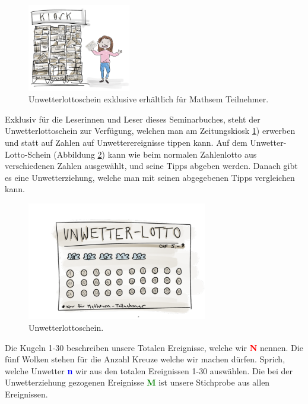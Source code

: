 \begin{refsection}
\begin{figure}[htbp]
\centering
\includegraphics[width=0.4\textwidth]{extrem/Kiosk.pdf}
\caption{Unwetterlottoschein exklusive erhältlich für Mathsem Teilnehmer.}
\label{Kiosk}
\end{figure}

Exklusiv für die Leserinnen und Leser dieses Seminarbuches, steht der Unwetterlottoschein zur Verfügung, welchen man am Zeitungskiosk \ref{Kiosk}) erwerben und statt auf Zahlen auf Unwetterereignisse tippen kann. Auf dem Unwetter-Lotto-Schein (Abbildung \ref{Lottoschein}) kann wie beim normalen Zahlenlotto aus verschiedenen Zahlen ausgewählt, und seine Tipps abgeben werden. Danach gibt es eine Unwetterziehung, welche man mit seinen abgegebenen Tipps vergleichen kann.

\begin{figure}[htbp]
\centering
\includegraphics[width=0.7\textwidth]{extrem/Lottoschein.pdf}
\caption{Unwetterlottoschein.}
\label{Lottoschein}
\end{figure}

Die Kugeln 1-30 beschreiben unsere Totalen Ereignisse, welche wir \textcolor{red}{\textbf{N}} nennen. Die fünf Wolken stehen für die Anzahl Kreuze welche wir machen dürfen. Sprich, welche Unwetter \textcolor{blue}{\textbf{n}} wir aus den totalen Ereignissen 1-30 auswählen. Die bei der Unwetterziehung gezogenen Ereignisse \textcolor{green}{\textbf{M}} ist unsere Stichprobe aus allen Ereignissen.


\end{refsection}
